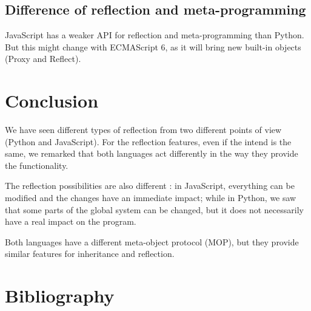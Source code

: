 \documentclass[a4paper,10pt]{article}
\begin{document}
\subsection{Difference of reflection and meta-programming}

JavaScript has a weaker API for reflection and meta-programming than Python. But this might change with ECMAScript 6, as it will bring new built-in objects (Proxy and Reflect).


\section{Conclusion}

We have seen different types of reflection from two different points of view (Python and JavaScript).
For the reflection features, even if the intend is the same, we remarked that both languages act differently in the way they provide the functionality.

The reflection possibilities are also different : in JavaScript, everything can be modified and the changes have an immediate impact; while in Python, we saw that some parts of the global system can be changed, but it does not necessarily have a real impact on the program.

Both languages have a different meta-object protocol (MOP), but they provide similar features for inheritance and reflection.


\section{Bibliography}




\end{document}
